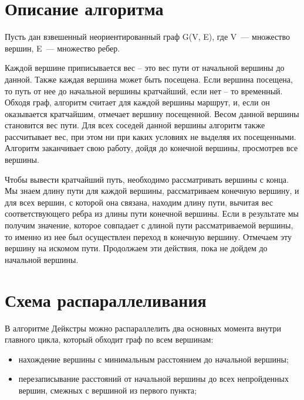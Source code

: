 \documentclass{report}
\begin{document}
\newpage

\section*{Описание алгоритма}
Пусть дан взвешенный неориентированный граф G(V, E), где V~--- множество вершин, E~--- множество ребер.
\par Каждой вершине приписывается вес – это вес пути от начальной вершины до данной. Также каждая вершина может быть посещена. Если вершина посещена, то путь от нее до начальной вершины кратчайший, если нет – то временный. Обходя граф, алгоритм считает для каждой вершины маршрут, и, если он оказывается кратчайшим, отмечает вершину посещенной. Весом данной вершины становится вес пути. Для всех соседей данной вершины алгоритм также рассчитывает вес, при этом ни при каких условиях не выделяя их посещенными. Алгоритм заканчивает свою работу, дойдя до конечной вершины, просмотрев все вершины.
\par Чтобы вывести кратчайший путь, необходимо рассматривать вершины с конца. Мы знаем длину пути для каждой вершины, рассматриваем конечную вершину, и для всех вершин, с которой она связана, находим длину пути, вычитая вес соответствующего ребра из длины пути конечной вершины. Если в результате мы получим значение, которое совпадает с длиной пути рассматриваемой вершины, то именно из нее был осуществлен переход в конечную вершину. Отмечаем эту вершину на искомом пути.
Продолжаем эти действия, пока не дойдем до начальной вершины.

\newpage

\section*{Схема распараллеливания}
В алгоритме Дейкстры можно распараллелить два основных момента внутри главного цикла, который обходит граф по всем вершинам:
\begin{itemize}
\item нахождение вершины с минимальным расстоянием до начальной вершины;
\item перезаписывание расстояний от начальной вершины до всех непройденных вершин, смежных с вершиной из первого пункта;
\end{itemize}
\newpage
\end{document}
